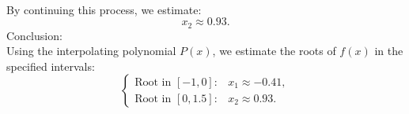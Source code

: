 \documentclass{article}
\begin{document}
\\
By continuing this process, we estimate:
\[
x_2 \approx 0.93.
\]
Conclusion:
\\
Using the interpolating polynomial \( P(x) \), we estimate the roots of \( f(x) \) in the specified intervals:
\[
\begin{cases}
\text{Root in } [-1, 0]: & x_1 \approx -0.41, \\
\text{Root in } [0, 1.5]: & x_2 \approx 0.93.
\end{cases}
\]
\end{document}
